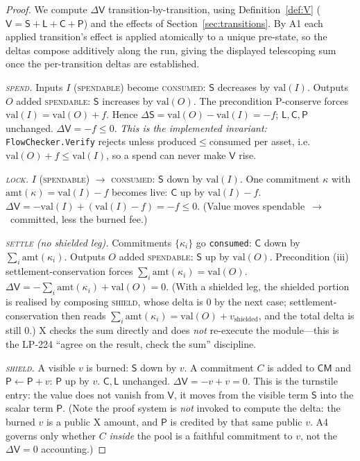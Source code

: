 \documentclass[11pt]{article}
\theoremstyle{definition}
\theoremstyle{remark}
\newcommand{\Val}{\mathsf{V}}
\newcommand{\spend}{\mathsf{S}}
\newcommand{\lock}{\mathsf{L}}
\newcommand{\commit}{\mathsf{C}}
\newcommand{\pool}{\mathsf{P}}
\newcommand{\CM}{\mathsf{CM}}
\begin{document}
\begin{proof}
We compute $\Delta\Val$ transition-by-transition, using
Definition~\ref{def:V} ($\Val=\spend+\lock+\commit+\pool$) and the effects
of Section~\ref{sec:transitions}. By A1 each applied transition's effect is
applied atomically to a unique pre-state, so the deltas compose additively
along the run, giving the displayed telescoping sum once the per-transition
deltas are established.

\emph{\textsc{spend}.} Inputs $I$ (\textsc{spendable}) become
\textsc{consumed}: $\spend$ decreases by $\mathrm{val}(I)$. Outputs $O$
added \textsc{spendable}: $\spend$ increases by $\mathrm{val}(O)$. The
precondition P-conserve forces $\mathrm{val}(I)=\mathrm{val}(O)+f$. Hence
$\Delta\spend = \mathrm{val}(O)-\mathrm{val}(I) = -f$; $\lock,\commit,\pool$
unchanged. $\Delta\Val=-f\le0$. \emph{This is the implemented invariant:}
\texttt{FlowChecker.Verify} rejects unless $\mathrm{produced}\le
\mathrm{consumed}$ per asset, i.e.\ $\mathrm{val}(O)+f\le\mathrm{val}(I)$,
so a spend can never make $\Val$ rise.

\emph{\textsc{lock}.} $I$ (\textsc{spendable}) $\to$ \textsc{consumed}:
$\spend$ down by $\mathrm{val}(I)$. One commitment $\kappa$ with
$\mathrm{amt}(\kappa)=\mathrm{val}(I)-f$ becomes live: $\commit$ up by
$\mathrm{val}(I)-f$. $\Delta\Val = -\mathrm{val}(I)+(\mathrm{val}(I)-f)
= -f\le0$. (Value moves spendable~$\to$~committed, less the burned fee.)

\emph{\textsc{settle} (no shielded leg).} Commitments $\{\kappa_i\}$ go
\texttt{consumed}: $\commit$ down by $\sum_i\mathrm{amt}(\kappa_i)$. Outputs
$O$ added \textsc{spendable}: $\spend$ up by $\mathrm{val}(O)$. Precondition
(iii) settlement-conservation forces $\sum_i\mathrm{amt}(\kappa_i)=
\mathrm{val}(O)$. $\Delta\Val = -\sum_i\mathrm{amt}(\kappa_i)+\mathrm{val}(O)
= 0$. (With a shielded leg, the shielded portion is realised by composing
\textsc{shield}, whose delta is $0$ by the next case; settlement-conservation
then reads $\sum_i\mathrm{amt}(\kappa_i)=\mathrm{val}(O)+v_{\text{shielded}}$,
and the total delta is still $0$.) X checks the sum directly and does
\emph{not} re-execute the module---this is the LP-224 ``agree on the result,
check the sum'' discipline.

\emph{\textsc{shield}.} A visible $v$ is burned: $\spend$ down by $v$. A
commitment $C$ is added to $\CM$ and $\pool\gets\pool+v$: $\pool$ up by $v$.
$\commit,\lock$ unchanged. $\Delta\Val = -v + v = 0$. This is the turnstile
entry: the value does not vanish from $\Val$, it moves from the visible
term $\spend$ into the scalar term $\pool$. (Note the proof system is
\emph{not} invoked to compute the delta: the burned $v$ is a public X
amount, and $\pool$ is credited by that same public $v$. A4 governs only
whether $C$ \emph{inside} the pool is a faithful commitment to $v$, not the
$\Delta\Val=0$ accounting.)


\end{proof}
\end{document}
